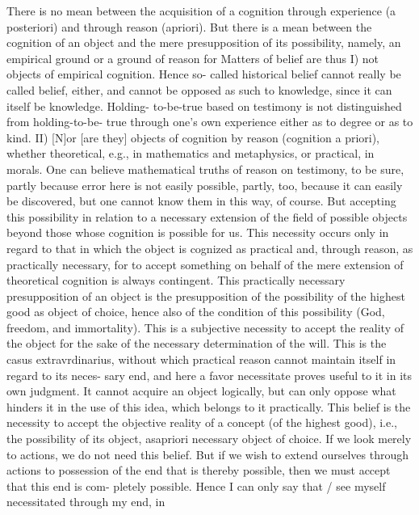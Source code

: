     There is no mean between the acquisition of a cognition through experience (a posteriori)
    and through reason (apriori). But there is a mean between the cognition of an object and the
    mere presupposition of its possibility, namely, an empirical ground or a ground of reason for
    Matters of belief are thus I) not objects of empirical cognition. Hence so-
    called historical belief cannot really be called belief, either, and cannot be
    opposed as such to knowledge, since it can itself be knowledge. Holding-
    to-be-true based on testimony is not distinguished from holding-to-be-
    true through one's own experience either as to degree or as to kind.
    II) [N]or [are they] objects of cognition by reason (cognition a priori),
    whether theoretical, e.g., in mathematics and metaphysics, or practical, in
    morals.
    One can believe mathematical truths of reason on testimony, to be sure,
    partly because error here is not easily possible, partly, too, because it can
    easily be discovered, but one cannot know them in this way, of course. But
    accepting this possibility in relation to a necessary extension of the field of possible objects
    beyond those whose cognition is possible for us. This necessity occurs only in regard to that
    in which the object is cognized as practical and, through reason, as practically necessary, for
    to accept something on behalf of the mere extension of theoretical cognition is always
    contingent. This practically necessary presupposition of an object is the presupposition of the
    possibility of the highest good as object of choice, hence also of the condition of this
    possibility (God, freedom, and immortality). This is a subjective necessity to accept the
    reality of the object for the sake of the necessary determination of the will. This is the casus
    extravrdinarius, without which practical reason cannot maintain itself in regard to its neces-
    sary end, and here a favor necessitate proves useful to it in its own judgment. It cannot acquire
    an object logically, but can only oppose what hinders it in the use of this idea, which belongs
    to it practically.
    This belief is the necessity to accept the objective reality of a concept (of the highest
    good), i.e., the possibility of its object, asapriori necessary object of choice. If we look merely
    to actions, we do not need this belief. But if we wish to extend ourselves through actions to
    possession of the end that is thereby possible, then we must accept that this end is com-
    pletely possible. Hence I can only say that / see myself necessitated through my end, in

